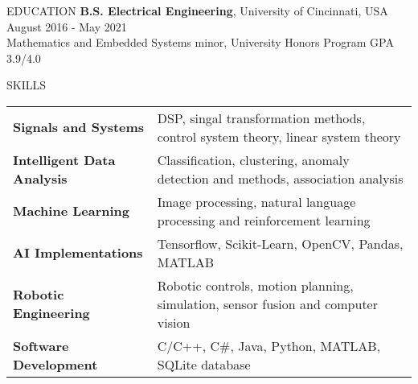 \documentclass{../lib/resume} %
\begin{document}

\begin{rSection}{EDUCATION}
    {\bf B.S. Electrical Engineering}, University of Cincinnati, USA \hfill {August 2016 - May 2021}\\
    Mathematics and Embedded Systems minor, University Honors Program \hfill {GPA 3.9/4.0}



\end{rSection}

\begin{rSection}{SKILLS}

    \begin{tabular}{ @{} >{\bfseries}l @{\hspace{2ex}} l }
        Signals and Systems       & DSP, singal transformation methods, control system theory, linear system theory  \\
        Intelligent Data Analysis & Classification, clustering, anomaly detection and methods, association analysis  \\
        Machine Learning          & Image processing, natural language processing and reinforcement learning         \\
        AI Implementations        & Tensorflow, Scikit-Learn, OpenCV, Pandas, MATLAB                                 \\
        Robotic Engineering       & Robotic controls, motion planning, simulation, sensor fusion and computer vision \\
        Software Development      & C/C++, C\#, Java, Python, MATLAB, SQLite database                                \\
    \end{tabular}
\end{rSection}
\end{document}
